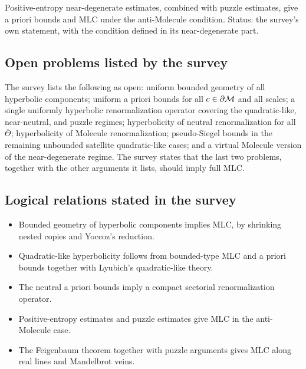 \begin{theorem}
\label{thm:survey-anti-molecule}
Positive-entropy near-degenerate estimates, combined with puzzle estimates, give a
priori bounds and MLC under the anti-Molecule condition.  Status: the survey's own statement, with the condition defined in its near-degenerate part.
\end{theorem}

\subsection*{Open problems listed by the survey}

\begin{openestimate}
\label{prob:survey}
The survey lists the following as open: uniform bounded geometry of all hyperbolic
components; uniform a priori bounds for all $c\in\partial\mathcal M$ and all scales; a
single uniformly hyperbolic renormalization operator covering the quadratic-like,
near-neutral, and puzzle regimes; hyperbolicity of neutral renormalization for all
$\overline\Theta$; hyperbolicity of Molecule renormalization; pseudo-Siegel bounds
in the remaining unbounded satellite quadratic-like cases; and a virtual Molecule
version of the near-degenerate regime.  The survey states that the last two
problems, together with the other arguments it lists, should imply full MLC.
\end{openestimate}

\subsection*{Logical relations stated in the survey}

\begin{itemize}
\item Bounded geometry of hyperbolic components implies MLC, by shrinking nested
  copies and Yoccoz's reduction.
\item Quadratic-like hyperbolicity follows from bounded-type MLC and a priori bounds
  together with Lyubich's quadratic-like theory.
\item The neutral a priori bounds imply a compact sectorial renormalization operator.
\item Positive-entropy estimates and puzzle estimates give MLC in the anti-Molecule case.
\item The Feigenbaum theorem together with puzzle arguments gives MLC along real lines
  and Mandelbrot veins.
\end{itemize}

